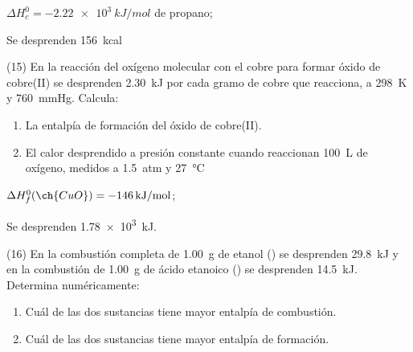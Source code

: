 \documentclass[10pt]{article}
\begin{document}
\begin{multicols}{2}
\begin{solution}
  \begin{enumerate*}
    \item \( \Delta H^0_c = \SI{-2.22e3}{kJ/mol} \) de propano;
    \item Se desprenden \SI{156}{kcal}
  \end{enumerate*}
\end{solution}




\begin{exercise}[
    tags    = {},
    topics  = {química, termodinámica, termoquímica},
    source  = {FQ 1B MGH 2016, p165, e15},
  ]
  (15) En la reacción del oxígeno molecular con el cobre para formar
  óxido de cobre(II) se desprenden \SI{2.30}{kJ} por cada gramo de
  cobre que reacciona, a \SI{298}{\kelvin} y \SI{760}{\mmHg}. Calcula:
  \begin{enumerate}
    \item La entalpía de formación del óxido de cobre(II).
    \item El calor desprendido a presión constante cuando reaccionan \SI{100}{\liter} de oxígeno, medidos a \SI{1.5}{atm} y \SI{27}{\celsius}
  \end{enumerate}
\end{exercise}

\begin{solution}
  \begin{enumerate*}
    \item \( \Delta H^0_f (\ch{CuO}) = \SI{-146}{kJ/mol} \);
    \item Se desprenden \SI{1.78e3}{kJ}.
  \end{enumerate*}
\end{solution}




\begin{exercise}[
    tags    = {},
    topics  = {química, termodinámica, termoquímica},
    source  = {FQ 1B MGH 2016, p165, e16},
  ]
  (16) En la combustión completa de \SI{1.00}{\gram} de etanol () se desprenden \SI{29.8}{kJ} y en la combustión de \SI{1.00}{\gram}
  de ácido etanoico () se desprenden \SI{14.5}{kJ}.
  Determina numéricamente:
  \begin{enumerate}
    \item Cuál de las dos sustancias tiene mayor entalpía de combustión.
    \item Cuál de las dos sustancias tiene mayor entalpía de formación.
  \end{enumerate}
\end{exercise}


\end{multicols}
\end{document}
